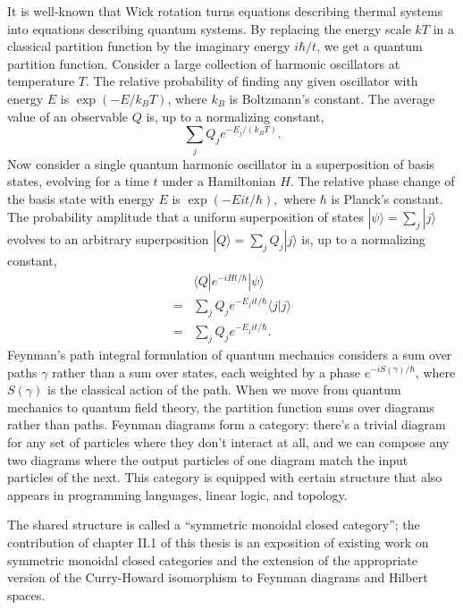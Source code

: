 \documentclass[12pt,twoside,openright]{report}
\begin{document}
It is well-known that Wick rotation turns equations describing thermal systems into equations describing quantum systems.  By replacing the energy scale $kT$ in a classical partition function by the imaginary energy $i\hbar/t$, we get a quantum partition function.  Consider a large collection of harmonic oscillators at temperature $T$.  The relative probability of finding any given oscillator with energy $E$ is $\exp(-E/k_B T)$, where $k_B$ is Boltzmann's constant. The average value of an observable $Q$ is, up to a normalizing constant,
\[ \sum_j Q_j e^{-E_j / (k_B T)}.\]
Now consider a single quantum harmonic oscillator in a superposition of basis states, evolving for a time $t$ under a Hamiltonian $H$. The relative phase change of the basis state with energy $E$ is $\exp(-E it/ \hbar),$ where $\hbar$ is Planck's constant. The probability amplitude that a uniform superposition of states $|\psi\rangle = \sum_j |j\rangle$ evolves to an arbitrary superposition $|Q\rangle = \sum_j Q_j |j\rangle$ is, up to a normalizing constant,
\begin{align*}
   & \langle Q|e^{-iHt/\hbar}|\psi\rangle \\
  = & \sum_j Q_j e^{-E_j it/ \hbar}\langle j|j\rangle \\
  = & \sum_j Q_j e^{-E_j it/ \hbar}.
\end{align*}
Feynman's path integral formulation of quantum mechanics considers a sum over paths $\gamma$ rather than a sum over states, each weighted by a phase $e^{-iS(\gamma)/\hbar}$, where $S(\gamma)$ is the classical action of the path.  When we move from quantum mechanics to quantum field theory, the partition function sums over diagrams rather than paths.  Feynman diagrams form a category: there's a trivial diagram for any set of particles where they don't interact at all, and we can compose any two diagrams where the output particles of one diagram match the input particles of the next.  This category is equipped with certain structure that also appears in programming languages, linear logic, and topology.  

The shared structure is called a ``symmetric monoidal closed category''; the contribution of chapter II.1 of this thesis is an exposition of existing work on symmetric monoidal closed categories and the extension of the appropriate version of the Curry-Howard isomorphism to Feynman diagrams and Hilbert spaces.  
\end{document}
